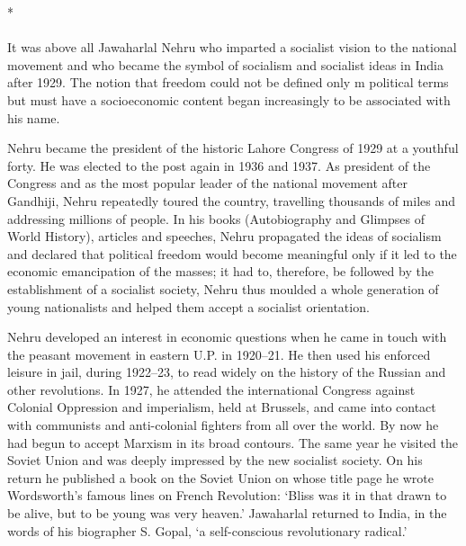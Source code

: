 \begin{multicols}{2}
\begin{center}*\end{center}

\paragraph*{}

It was above all Jawaharlal Nehru who imparted a socialist vision to the national movement and who became the symbol of socialism and socialist ideas in India after 1929. The notion that freedom could not be defined only m political terms but must have a socioeconomic content began increasingly to be associated with his name. 

Nehru became the president of the historic Lahore Congress of 1929 at a youthful forty. He was elected to the post again in 1936 and 1937. As president of the Congress and as the most popular leader of the national movement after Gandhiji, Nehru repeatedly toured the country, travelling thousands of miles and addressing millions of people. In his books (Autobiography and Glimpses of World History), articles and speeches, Nehru propagated the ideas of socialism and declared that political freedom would become meaningful only if it led to the economic emancipation of the masses; it had to, therefore, be followed by the establishment of a socialist society, Nehru thus moulded a whole generation of young nationalists and helped them accept a socialist orientation. 

Nehru developed an interest in economic questions when he came in touch with the peasant movement in eastern U.P. in 1920--21. He then used his enforced leisure in jail, during 1922--23, to read widely on the history of the Russian and other revolutions. In 1927, he attended the international Congress against Colonial Oppression and imperialism, held at Brussels, and came into contact with communists and anti-colonial fighters from all over the world. By now he had begun to accept Marxism in its broad contours. The same year he visited the Soviet Union and was deeply impressed by the new socialist society. On his return he published a book on the Soviet Union on whose title page he wrote Wordsworth's famous lines on French Revolution: `Bliss was it in that drawn to be alive, but to be young was very heaven.' Jawaharlal returned to India, in the words of his biographer S. Gopal, `a self-conscious revolutionary radical.' 


\end{multicols}
